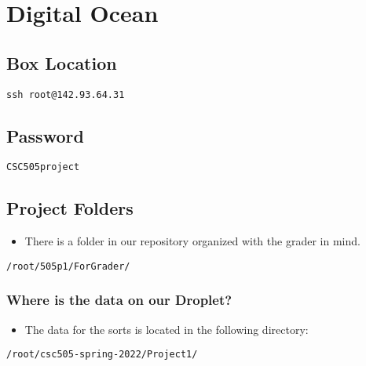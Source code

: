 \documentclass[11pt]{article}
\author{DESKTOP-OEFS7VE}
\date{\today}
\title{}
\begin{document}
\tableofcontents

\section{Digital Ocean}
\label{sec:org98879b1}
\subsection{Box Location}
\label{sec:orgcbb8043}
\lstset{language=shell,label= ,caption= ,captionpos=b,numbers=none}
\begin{lstlisting}
ssh root@142.93.64.31
\end{lstlisting}
\subsection{Password}
\label{sec:org2a1e2f6}
\lstset{language=shell,label= ,caption= ,captionpos=b,numbers=none}
\begin{lstlisting}
CSC505project
\end{lstlisting}
\subsection{Project Folders}
\label{sec:org5450454}
\begin{itemize}
\item There is a folder in our repository organized with the grader in mind.
\end{itemize}
\lstset{language=shell,label= ,caption= ,captionpos=b,numbers=none}
\begin{lstlisting}
/root/505p1/ForGrader/
\end{lstlisting}
\subsubsection{Where is the data on our Droplet?}
\label{sec:orgb0cc0f1}
\begin{itemize}
\item The data for the sorts is located in the following directory:
\end{itemize}
\lstset{language=shell,label= ,caption= ,captionpos=b,numbers=none}
\begin{lstlisting}
/root/csc505-spring-2022/Project1/
\end{lstlisting}
\end{document}
